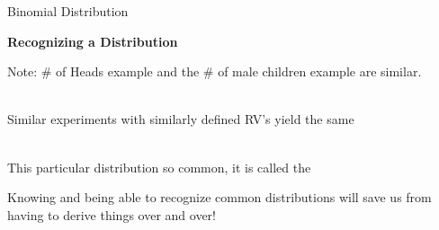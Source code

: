 \newpage

\huge Binomial Distribution \\\normalsize

\textbf{Recognizing a Distribution}
\bi
\item Note: \# of Heads example and the \# of male children example are similar.\\~\\
\item Similar experiments with similarly defined RV's yield the same \underbar{~~~~~~~~~~~~~~~~~~~~~~~~~~~~~~~~~~~~~~~~~~~~~~~~~}\\~\\
\item This particular distribution so common, it is called the \underbar{~~~~~~~~~~~~~~~~~~~~~~~~~~~~~~~~~~~~~~~~~~~~~~~~~}
\item Knowing and being able to recognize common distributions will save us from having to derive things over and over!
\ei

